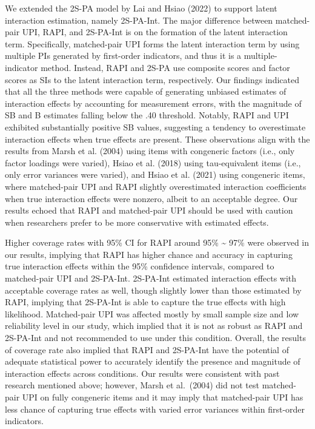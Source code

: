 \documentclass[
  man]{apa6}
\begin{document}
We extended the 2S-PA model by Lai and Hsiao (2022) to support latent interaction estimation, namely 2S-PA-Int.
The major difference between matched-pair UPI, RAPI, and 2S-PA-Int is on the formation of the latent interaction term. Specifically, matched-pair UPI forms the latent interaction term by using multiple PIs generated by first-order indicators, and thus it is a multiple-indicator method. Instead, RAPI and 2S-PA use composite scores and factor scores as SIs to the latent interaction term, respectively. Our findings indicated that all the three methods were capable of generating unbiased estimates of interaction effects by accounting for measurement errors, with the magnitude of SB and B estimates falling below the .40 threshold. Notably, RAPI and UPI exhibited substantially positive SB values, suggesting a tendency to overestimate interaction effects when true effects are present. These observations align with the results from Marsh et al. (2004) using items with congeneric factors (i.e., only factor loadings were varied), Hsiao et al. (2018) using tau-equivalent items (i.e., only error variances were varied), and Hsiao et al. (2021) using congeneric items, where matched-pair UPI and RAPI slightly overestimated interaction coefficients when true interaction effects were nonzero, albeit to an acceptable degree. Our results echoed that RAPI and matched-pair UPI should be used with caution when researchers prefer to be more conservative with estimated effects.

Higher coverage rates with 95\% CI for RAPI around 95\% \textasciitilde{} 97\% were observed in our results, implying that RAPI has higher chance and accuracy in capturing true interaction effects within the 95\% confidence intervals, compared to matched-pair UPI and 2S-PA-Int. 2S-PA-Int estimated interaction effects with acceptable coverage rates as well, though slightly lower than those estimated by RAPI, implying that 2S-PA-Int is able to capture the true effects with high likelihood. Matched-pair UPI was affected mostly by small sample size and low reliability level in our study, which implied that it is not as robust as RAPI and 2S-PA-Int and not recommended to use under this condition. Overall, the results of coverage rate also implied that RAPI and 2S-PA-Int have the potential of adequate statistical power to accurately identify the presence and magnitude of interaction effects across conditions. Our results were consistent with past research mentioned above; however, Marsh et al.~(2004) did not test matched-pair UPI on fully congeneric items and it may imply that matched-pair UPI has less chance of capturing true effects with varied error variances within first-order indicators.
\end{document}
